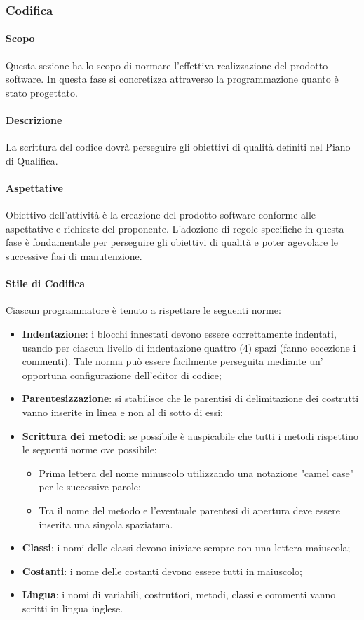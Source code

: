 \subsubsection{Codifica}
\paragraph{Scopo}
Questa sezione ha lo scopo di normare l'effettiva realizzazione del prodotto software.  In questa fase si concretizza attraverso la programmazione quanto è stato progettato.

\paragraph{Descrizione}
La scrittura del codice dovrà perseguire gli obiettivi di qualità definiti nel Piano di Qualifica.

\paragraph{Aspettative}
Obiettivo dell'attività è la creazione del prodotto software conforme alle aspettative e richieste del proponente.  L'adozione di regole specifiche in questa fase è fondamentale per perseguire gli obiettivi di qualità e poter agevolare le successive fasi di manutenzione.

\paragraph{Stile di Codifica}
Ciascun programmatore è tenuto a rispettare le seguenti norme:

\begin{itemize}
  \item \textbf{Indentazione}: i blocchi innestati devono essere correttamente indentati, usando per ciascun livello di indentazione quattro (4) spazi (fanno eccezione i commenti).  Tale norma può essere facilmente perseguita mediante un' opportuna configurazione dell'editor di codice;
  \item \textbf{Parentesizzazione}: si stabilisce che le parentisi di delimitazione dei costrutti vanno inserite in linea e non al di sotto di essi;
  \item \textbf{Scrittura dei metodi}: se possibile è auspicabile che tutti i metodi rispettino le seguenti norme ove possibile:
        \begin{itemize}
          \item Prima lettera del nome minuscolo utilizzando una notazione "camel case" per le successive parole;
          \item Tra il nome del metodo e l'eventuale parentesi di apertura deve essere inserita una singola spaziatura.
        \end{itemize}
  \item \textbf{Classi}: i nomi delle classi devono iniziare sempre con una lettera maiuscola;
  \item \textbf{Costanti}: i nome delle costanti devono essere tutti in maiuscolo;
  \item \textbf{Lingua}: i nomi di variabili, costruttori, metodi, classi e commenti vanno scritti in lingua inglese.
\end{itemize}

